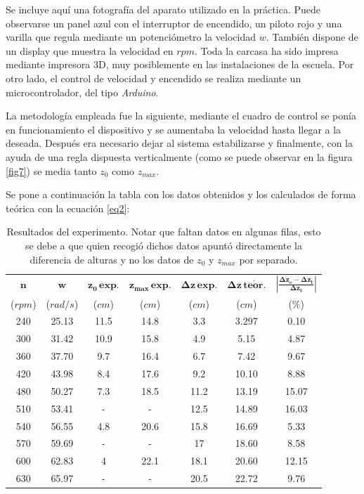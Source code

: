 \documentclass[12pt,a4paper]{article}
\begin{document}
Se incluye aquí una fotografía del aparato utilizado en la práctica. 
Puede observarse un panel azul con el interruptor de encendido, un piloto rojo y una varilla que regula mediante un potenciómetro la velocidad $w$. También dispone de un display que muestra la velocidad en $rpm$. Toda la carcasa ha sido impresa mediante impresora 3D, muy posiblemente en las instalaciones de la escuela. Por otro lado, el control de velocidad y encendido se realiza mediante un microcontrolador, del tipo \emph{Arduino}.

La metodología empleada fue la siguiente, mediante el cuadro de control se ponía en funcionamiento el dispositivo y se aumentaba la velocidad hasta llegar a la deseada. Después  era necesario dejar al sistema estabilizarse  y finalmente, con la ayuda de una regla dispuesta verticalmente (como se puede observar en la figura \ref{fig7}) se media tanto $z_{0}$ como $z_{max}$.

Se pone a continuación la tabla con los datos obtenidos y los calculados de forma teórica con la ecuación \ref{eq2}:

\begin{table}[htbp]
  \centering
    \begin{tabular}{ccccccc}
    \toprule
    \multicolumn{1}{c}{$\mathbf{n}$} & \multicolumn{1}{c}{$\mathbf{w}$} & \multicolumn{1}{c}{$\mathbf{z_{0}\,exp.}$} & \multicolumn{1}{c}{$\mathbf{z_{max}\,exp.}$} & \multicolumn{1}{c}{$\boldsymbol{\Delta z \,exp.}$} & \multicolumn{1}{c}{$\boldsymbol{\Delta z\,te\acute{o}r.}$} & \multicolumn{1}{c}{$\mathbf{\left|\frac{\Delta z_{e}-\Delta z_{t}}{\Delta z_{t}}\right|}$} \\
    {\small ($rpm$)} & {\small ($rad/s$)} & {\small ($cm$)} & {\small ($cm$)} & {\small ($cm$)} & {\small ($cm$)} & {\small ($\%$)}\\
    \midrule
    240 & 25.13 & 11.5 & 14.8 & 3.3 & 3.297 & 0.10 \\
    300 & 31.42 & 10.9 & 15.8 & 4.9 & 5.15 & 4.87 \\
    360 & 37.70 & 9.7 & 16.4 & 6.7 & 7.42 & 9.67 \\
    420 & 43.98 & 8.4 & 17.6 & 9.2 & 10.10 & 8.88 \\
    480 & 50.27 & 7.3 & 18.5 & 11.2 & 13.19 & 15.07 \\
    510 & 53.41 & - & - & 12.5 & 14.89 & 16.03 \\
    540 & 56.55 & 4.8 & 20.6 & 15.8 & 16.69 & 5.33 \\
    570 & 59.69 & - & - & 17 & 18.60 & 8.58 \\
    600 & 62.83 & 4 & 22.1 & 18.1 & 20.60 & 12.15 \\
    630 & 65.97 & - & - & 20.5 & 22.72 & 9.76 \\
    \bottomrule
    \end{tabular}
    \caption{Resultados del experimento. Notar que faltan datos en algunas filas, esto se debe a que quien recogió dichos datos apuntó directamente la diferencia de alturas y no los datos de $z_{0}$ y $z_{max}$ por separado.}
  \label{tab3}
\end{table}
\newpage
\end{document}

